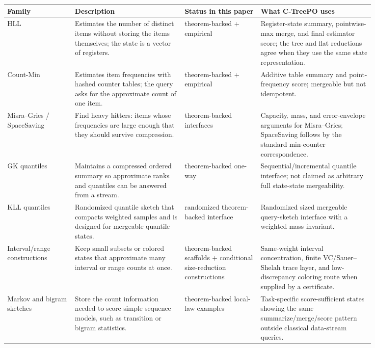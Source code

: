 \begin{table}[t]
\centering
\scriptsize
\setlength{\tabcolsep}{3pt}
\begin{tabular}{@{}p{0.16\linewidth}p{0.26\linewidth}p{0.18\linewidth}p{0.27\linewidth}@{}}
\toprule
Family & Description & Status in this paper & What C-TreePO uses \\
\midrule
HLL & Estimates the number of distinct items without storing the items
themselves; the state is a vector of registers. & theorem-backed + empirical & Register-state summary, pointwise-max merge, and final estimator score; the tree and flat reductions agree when they use the same state representation. \\
Count-Min & Estimates item frequencies with hashed counter tables; the query
asks for the approximate count of one item. & theorem-backed + empirical & Additive table summary and point-frequency score; mergeable but not idempotent. \\
Misra--Gries / SpaceSaving & Find heavy hitters: items whose frequencies are
large enough that they should survive compression. & theorem-backed interfaces & Capacity, mass, and error-envelope arguments for Misra--Gries; SpaceSaving follows by the standard min-counter correspondence. \\
GK quantiles & Maintains a compressed ordered summary so approximate ranks and
quantiles can be answered from a stream. & theorem-backed one-way & Sequential/incremental quantile interface; not claimed as arbitrary full state-state mergeability. \\
KLL quantiles & Randomized quantile sketch that compacts weighted samples and is
designed for mergeable quantile states. & randomized theorem-backed interface & Randomized sized mergeable query-sketch interface with a weighted-mass invariant. \\
Interval/range constructions & Keep small subsets or colored states that approximate many interval or range counts at once. & theorem-backed scaffolds + conditional size-reduction constructions & Same-weight interval concentration, finite VC/Sauer--Shelah trace layer, and low-discrepancy coloring route when supplied by a certificate. \\
Markov and bigram sketches & Store the count information needed to score simple sequence models, such as transition or bigram statistics. & theorem-backed local-law examples & Task-specific score-sufficient states showing the same summarize/merge/score pattern outside classical data-stream queries. \\

\end{tabular}
\end{table}
